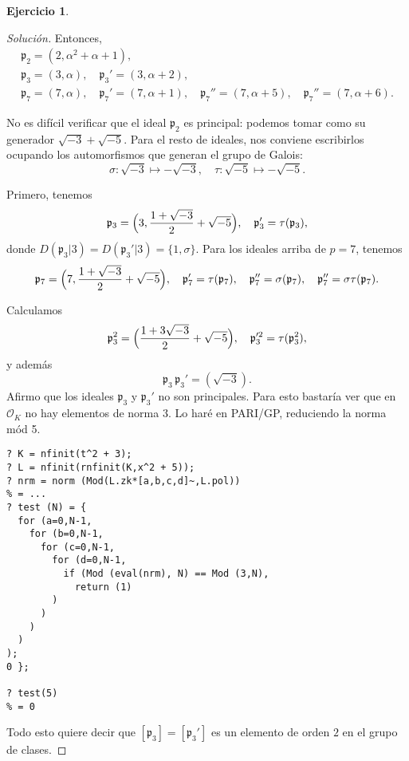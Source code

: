 \documentclass{article}
\newcounter{tarea}
\theoremstyle{definition}
\newtheorem{ejercicio}{Ejercicio}[tarea]
\newenvironment{solucion}{\begin{proof}[Solución]}{\end{proof}}
\renewcommand{\O}{\mathcal{O}}
\begin{document}
\begin{ejercicio}
\begin{solucion}
    Entonces,
    \begin{gather*}
      \mathfrak{p}_2 = (2, \alpha^2 + \alpha + 1), \\
      \mathfrak{p}_3 = (3, \alpha), \quad
      \mathfrak{p}_3' = (3, \alpha+2), \\
      \mathfrak{p}_7 = (7, \alpha), \quad
      \mathfrak{p}_7' = (7, \alpha+1), \quad
      \mathfrak{p}_7'' = (7, \alpha+5), \quad
      \mathfrak{p}_7'' = (7, \alpha+6).
    \end{gather*}

    No es difícil verificar que el ideal $\mathfrak{p}_2$ es principal: podemos
    tomar como su generador $\sqrt{-3} + \sqrt{-5}$. Para el resto de ideales,
    nos conviene escribirlos ocupando los automorfismos que generan el grupo de
    Galois:
    \[ \sigma\colon \sqrt{-3} \mapsto -\sqrt{-3}, \quad
      \tau\colon \sqrt{-5} \mapsto -\sqrt{-5}. \]

    Primero, tenemos
    \[ \mathfrak{p}_3 = \Bigl(3, \frac{1+\sqrt{-3}}{2} + \sqrt{-5}\Bigr), \quad
      \mathfrak{p}_3' = \tau (\mathfrak{p}_3), \]
    donde $D (\mathfrak{p}_3|3) = D (\mathfrak{p}_3'|3) = \{ 1, \sigma \}$.
    Para los ideales arriba de $p = 7$, tenemos
    \begin{gather*}
      \mathfrak{p}_7 = \Bigl(7, \frac{1+\sqrt{-3}}{2} + \sqrt{-5}\Bigr), \quad
      \mathfrak{p}_7' = \tau (\mathfrak{p}_7), \quad
      \mathfrak{p}_7'' = \sigma (\mathfrak{p}_7), \quad
      \mathfrak{p}_7'' = \sigma\tau (\mathfrak{p}_7).
    \end{gather*}

    Calculamos
    \[ \mathfrak{p}_3^2 = \Bigl(\frac{1 + 3\sqrt{-3}}{2} + \sqrt{-5}\Bigr),
      \quad
      \mathfrak{p}_3'^2 = \tau (\mathfrak{p}_3^2), \]
    y además
    $$\mathfrak{p}_3\,\mathfrak{p}_3' = (\sqrt{-3}).$$
    Afirmo que los ideales $\mathfrak{p}_3$ y $\mathfrak{p}_3'$ no son
    principales. Para esto bastaría ver que en $\O_K$ no hay elementos de norma
    $3$. Lo haré en PARI/GP, reduciendo la norma mód 5.

    \begin{framed}
\begin{verbatim}
? K = nfinit(t^2 + 3);
? L = nfinit(rnfinit(K,x^2 + 5));
? nrm = norm (Mod(L.zk*[a,b,c,d]~,L.pol))
% = ...
? test (N) = {
  for (a=0,N-1,
    for (b=0,N-1,
      for (c=0,N-1,
        for (d=0,N-1,
          if (Mod (eval(nrm), N) == Mod (3,N),
            return (1)
        )
      )
    )
  )
);
0 };

? test(5)
% = 0
\end{verbatim}
    \end{framed}
    Todo esto quiere decir que $[\mathfrak{p}_3] = [\mathfrak{p}_3']$ es un
    elemento de orden $2$ en el grupo de clases.


\end{solucion}
\end{ejercicio}
\end{document}
